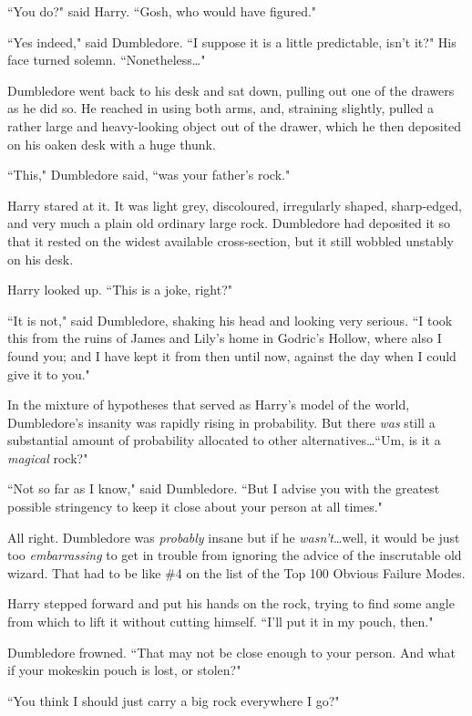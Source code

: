 ``You do?" said Harry. ``Gosh, who would have figured."

``Yes indeed," said Dumbledore. ``I suppose it is a little predictable, isn't it?" His face turned solemn. ``Nonetheless…"

Dumbledore went back to his desk and sat down, pulling out one of the drawers as he did so. He reached in using both arms, and, straining slightly, pulled a rather large and heavy-looking object out of the drawer, which he then deposited on his oaken desk with a huge thunk.

``This," Dumbledore said, ``was your father's rock."

Harry stared at it. It was light grey, discoloured, irregularly shaped, sharp-edged, and very much a plain old ordinary large rock. Dumbledore had deposited it so that it rested on the widest available cross-section, but it still wobbled unstably on his desk.

Harry looked up. ``This is a joke, right?"

``It is not," said Dumbledore, shaking his head and looking very serious. ``I took this from the ruins of James and Lily's home in Godric's Hollow, where also I found you; and I have kept it from then until now, against the day when I could give it to you."

In the mixture of hypotheses that served as Harry's model of the world, Dumbledore's insanity was rapidly rising in probability. But there \emph{was} still a substantial amount of probability allocated to other alternatives…``Um, is it a \emph{magical} rock?"

``Not so far as I know," said Dumbledore. ``But I advise you with the greatest possible stringency to keep it close about your person at all times."

All right. Dumbledore was \emph{probably} insane but if he \emph{wasn't}…well, it would be just too \emph{embarrassing} to get in trouble from ignoring the advice of the inscrutable old wizard. That had to be like \#4 on the list of the Top 100 Obvious Failure Modes.

Harry stepped forward and put his hands on the rock, trying to find some angle from which to lift it without cutting himself. ``I'll put it in my pouch, then."

Dumbledore frowned. ``That may not be close enough to your person. And what if your mokeskin pouch is lost, or stolen?"

``You think I should just carry a big rock everywhere I go?"


